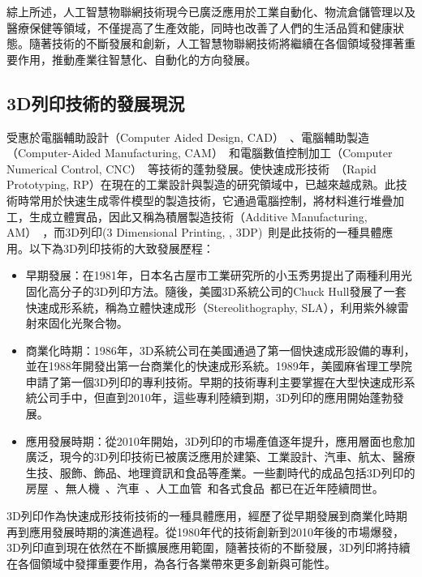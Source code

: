 \documentclass[class=NCU_thesis, crop=false]{standalone}
\begin{document}
綜上所述，人工智慧物聯網技術現今已廣泛應用於工業自動化、物流倉儲管理以及醫療保健等領域，不僅提高了生產效能，同時也改善了人們的生活品質和健康狀態。隨著技術的不斷發展和創新，人工智慧物聯網技術將繼續在各個領域發揮著重要作用，推動產業往智慧化、自動化的方向發展。

\subsection{3D列印技術的發展現況}
受惠於電腦輔助設計（Computer Aided Design, CAD）~\cite{sarcar2008computer}、電腦輔助製造（Computer-Aided Manufacturing, CAM）~\cite{elanchezhian2007computer}和電腦數值控制加工（Computer Numerical Control, CNC）~\cite{thyer2014computer}等技術的蓬勃發展。使快速成形技術~\cite{PHAM19981257}（Rapid Prototyping, RP）在現在的工業設計與製造的研究領域中，已越來越成熟。此技術時常用於快速生成零件模型的製造技術，它通過電腦控制，將材料進行堆疊加工，生成立體實品，因此又稱為積層製造技術（Additive Manufacturing, AM）~\cite{wong2012review}，而3D列印(3 Dimensional Printing, , 3DP)~\cite{shahrubudin2019overview}則是此技術的一種具體應用。以下為3D列印技術的大致發展歷程：


\begin{itemize}
    \item 早期發展：在1981年，日本名古屋市工業研究所的小玉秀男提出了兩種利用光固化高分子的3D列印方法。隨後，美國3D系統公司的Chuck Hull發展了一套快速成形系統，稱為立體快速成形（Stereolithography, SLA），利用紫外線雷射來固化光聚合物。

    \item 商業化時期：1986年，3D系統公司在美國通過了第一個快速成形設備的專利，並在1988年開發出第一台商業化的快速成形系統。1989年，美國麻省理工學院申請了第一個3D列印的專利技術。早期的技術專利主要掌握在大型快速成形系統公司手中，但直到2010年，這些專利陸續到期，3D列印的應用開始蓬勃發展。

    \item 應用發展時期：從2010年開始，3D列印的市場產值逐年提升，應用層面也愈加廣泛，現今的3D列印技術已被廣泛應用於建築、工業設計、汽車、航太、醫療生技、服飾、飾品、地理資訊和食品等產業。一些劃時代的成品包括3D列印的房屋~\cite{hager20163d}、無人機~\cite{moon2014application}、汽車~\cite{chinthavali20163d}、人工血管~\cite{papaioannou20193d}和各式食品~\cite{liu20173d}都已在近年陸續問世。

\end{itemize}
3D列印作為快速成形技術技術的一種具體應用，經歷了從早期發展到商業化時期再到應用發展時期的演進過程。從1980年代的技術創新到2010年後的市場爆發，3D列印直到現在依然在不斷擴展應用範圍，隨著技術的不斷發展，3D列印將持續在各個領域中發揮重要作用，為各行各業帶來更多創新與可能性。
\end{document}
